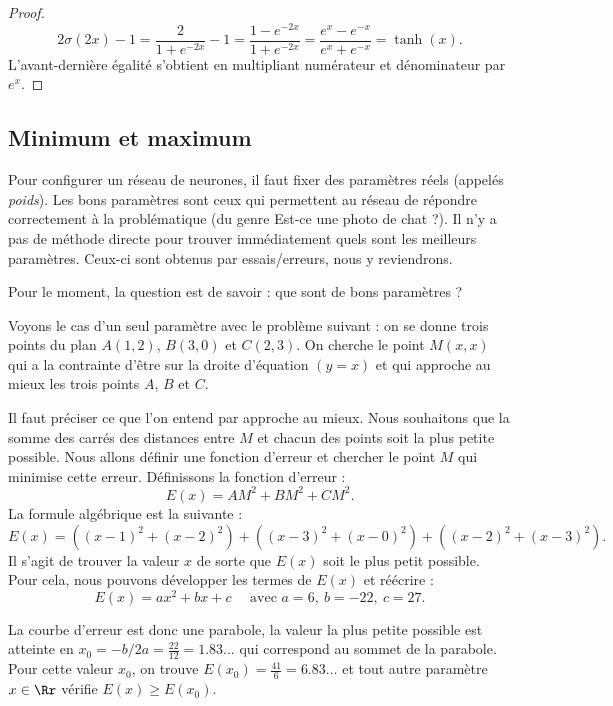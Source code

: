 \documentclass[11pt,class=report,crop=false]{standalone}
\begin{document}
\begin{proof}
$$2\sigma(2x)-1
= \frac{2}{1+e^{-2x}} - 1
= \frac{1-e^{-2x}}{1+e^{-2x}}
= \frac{e^{x}-e^{-x}}{e^{x}+e^{-x}}
= \tanh(x).$$
L'avant-dernière égalité s'obtient en multipliant numérateur et dénominateur par $e^x$.
\end{proof}


\subsection{Minimum et maximum}


Pour configurer un réseau de neurones, il faut fixer des paramètres réels (appelés \emph{poids}). Les bons paramètres sont ceux qui permettent au réseau de répondre correctement à la problématique (du genre \og{}Est-ce une photo de chat ?\fg{}). Il n'y a pas de méthode directe pour trouver immédiatement quels sont les meilleurs paramètres. Ceux-ci sont obtenus par essais/erreurs, nous y reviendrons.

Pour le moment, la question est de savoir : que sont de \og{}bons\fg{} paramètres ?



Voyons le cas d'un seul paramètre avec le problème suivant :
on se donne trois points du plan $A(1,2)$, $B(3,0)$ et $C(2,3)$. On cherche le point 
$M(x,x)$ qui a la contrainte d'être sur la droite d'équation $(y=x)$  et qui approche au mieux les trois points $A$, $B$ et $C$. 



Il faut préciser ce que l'on entend par \og{}approche au mieux\fg{}. Nous souhaitons que la somme des carrés des distances entre $M$ et chacun des points soit la plus petite possible. Nous allons définir une fonction d'erreur et chercher le point $M$ qui minimise cette erreur. 
Définissons la fonction d'erreur :
$$E(x) = AM^2 + BM^2 + CM^2.$$
La formule algébrique est la suivante :
$$E(x) = \left((x-1)^2+(x-2)^2\right)+\left((x-3)^2+(x-0)^2\right)+\left((x-2)^2+(x-3)^2\right).$$
Il s'agit de trouver la valeur $x$ de sorte que $E(x)$ soit le plus petit possible.
Pour cela, nous pouvons développer les termes de $E(x)$ et réécrire :
$$E(x) = ax^2+bx+c \quad \text{ avec } a = 6,\  b = -22,\  c = 27.$$ 


La courbe d'erreur est donc une parabole, la valeur la plus petite possible est atteinte en $x_0 = -b/2a = \frac{22}{12}=1.83\ldots$ qui correspond au sommet de la parabole.
Pour cette valeur $x_0$, on trouve $E(x_0)=\frac{41}{6} = 6.83\ldots$ et tout autre paramètre $x\in\Rr$ vérifie $E(x) \ge E(x_0)$.
\end{document}
